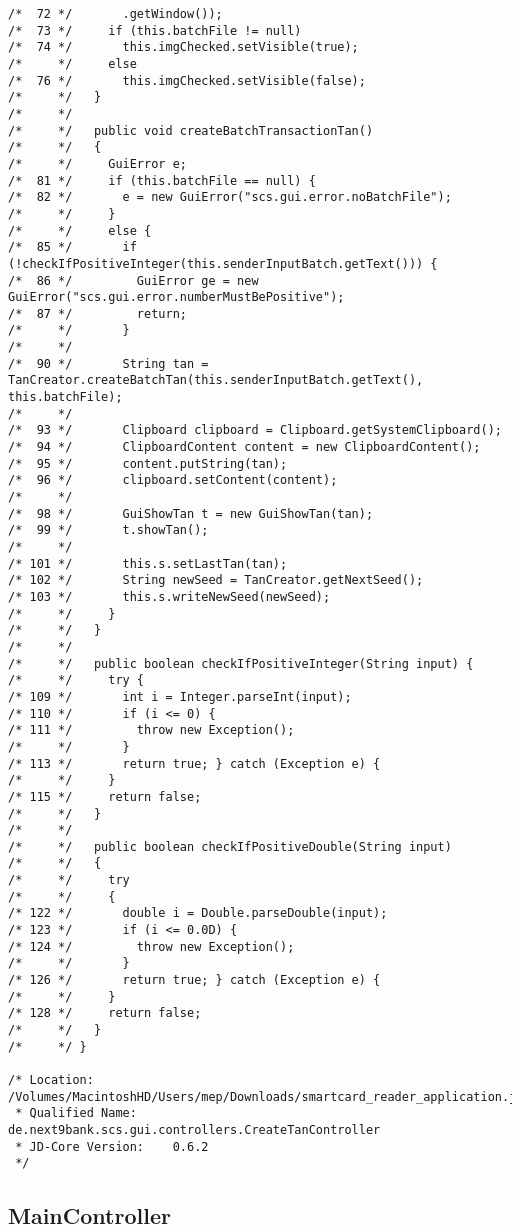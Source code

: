 \begin{lstlisting}
/*  72 */       .getWindow());
/*  73 */     if (this.batchFile != null)
/*  74 */       this.imgChecked.setVisible(true);
/*     */     else
/*  76 */       this.imgChecked.setVisible(false);
/*     */   }
/*     */ 
/*     */   public void createBatchTransactionTan()
/*     */   {
/*     */     GuiError e;
/*  81 */     if (this.batchFile == null) {
/*  82 */       e = new GuiError("scs.gui.error.noBatchFile");
/*     */     }
/*     */     else {
/*  85 */       if (!checkIfPositiveInteger(this.senderInputBatch.getText())) {
/*  86 */         GuiError ge = new GuiError("scs.gui.error.numberMustBePositive");
/*  87 */         return;
/*     */       }
/*     */ 
/*  90 */       String tan = TanCreator.createBatchTan(this.senderInputBatch.getText(), this.batchFile);
/*     */ 
/*  93 */       Clipboard clipboard = Clipboard.getSystemClipboard();
/*  94 */       ClipboardContent content = new ClipboardContent();
/*  95 */       content.putString(tan);
/*  96 */       clipboard.setContent(content);
/*     */ 
/*  98 */       GuiShowTan t = new GuiShowTan(tan);
/*  99 */       t.showTan();
/*     */ 
/* 101 */       this.s.setLastTan(tan);
/* 102 */       String newSeed = TanCreator.getNextSeed();
/* 103 */       this.s.writeNewSeed(newSeed);
/*     */     }
/*     */   }
/*     */ 
/*     */   public boolean checkIfPositiveInteger(String input) {
/*     */     try {
/* 109 */       int i = Integer.parseInt(input);
/* 110 */       if (i <= 0) {
/* 111 */         throw new Exception();
/*     */       }
/* 113 */       return true; } catch (Exception e) {
/*     */     }
/* 115 */     return false;
/*     */   }
/*     */ 
/*     */   public boolean checkIfPositiveDouble(String input)
/*     */   {
/*     */     try
/*     */     {
/* 122 */       double i = Double.parseDouble(input);
/* 123 */       if (i <= 0.0D) {
/* 124 */         throw new Exception();
/*     */       }
/* 126 */       return true; } catch (Exception e) {
/*     */     }
/* 128 */     return false;
/*     */   }
/*     */ }

/* Location:           /Volumes/MacintoshHD/Users/mep/Downloads/smartcard_reader_application.jar
 * Qualified Name:     de.next9bank.scs.gui.controllers.CreateTanController
 * JD-Core Version:    0.6.2
 */
\end{lstlisting}

\subsection{MainController}

